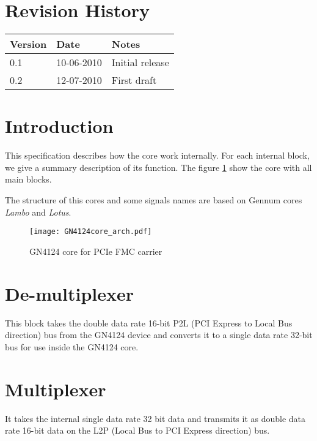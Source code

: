 \documentclass[10pt,a4paper]{cerndoc}
\begin{document}
  \cerntitle
  \section*{Revision History}
  \begin{tabularx}{\textwidth}{|p{3cm}|p{3cm}|X|}
    \hline \textbf{Version}&\textbf{Date}&\textbf{Notes}\\ \hline \hline
    0.1 & 10-06-2010 & Initial release\\ \hline
    0.2 & 12-07-2010 & First draft\\ \hline

  \end{tabularx}

  \tableofcontents
  \listoffigures
  \clearpage

  \section*{Introduction}
This specification describes how the core work internally. For each internal block, we give a summary description of its function.
The figure \ref{fig:GN4124core_arch} show the core with all main blocks.

The structure of this cores and some signals names are based on Gennum cores \emph{Lambo} and \emph{Lotus}. 

\begin{figure}[!ht]
  \centering
    \texttt{[image: GN4124core\_arch.pdf]}
  \caption{GN4124 core for PCIe FMC carrier}
  \label{fig:GN4124core_arch}
\end{figure}

  \section{De-multiplexer}
  This block takes the double data rate 16-bit P2L (PCI Express to Local Bus direction) bus from the GN4124 device and converts it to a single data rate 32-bit bus for use inside the GN4124 core.
  
  \section{Multiplexer}
  It takes the internal single data rate 32 bit data and transmits it as double data rate 16-bit data on the L2P (Local Bus to PCI Express direction) bus.
  
\end{document}
